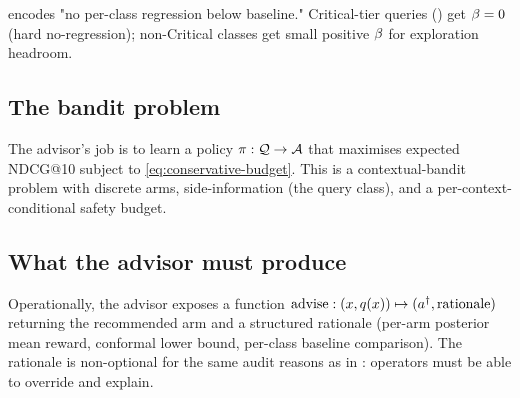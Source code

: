  encodes "no per-class regression below
baseline." Critical-tier queries () get $\beta = 0$ (hard no-regression);
non-Critical classes get small positive $\beta$ for exploration headroom.

\subsection{The bandit problem}

The advisor's job is to learn a policy $\pi : \mathcal{Q} \to \mathcal{A}$
that maximises expected NDCG@10 subject to \cref{eq:conservative-budget}.
This is a contextual-bandit problem with discrete arms, side-information
(the query class), and a per-context-conditional safety budget.

\subsection{What the advisor must produce}

Operationally, the advisor exposes a function
\(
  \mathrm{advise} : (x, q(x)) \mapsto (a^\dagger, \mathrm{rationale})
\)
returning the recommended arm and a structured rationale (per-arm
posterior mean reward, conformal lower bound, per-class baseline
comparison). The rationale is non-optional for the same audit reasons as
in \cite{blackrim_moa1c}: operators must be able to override and explain.
